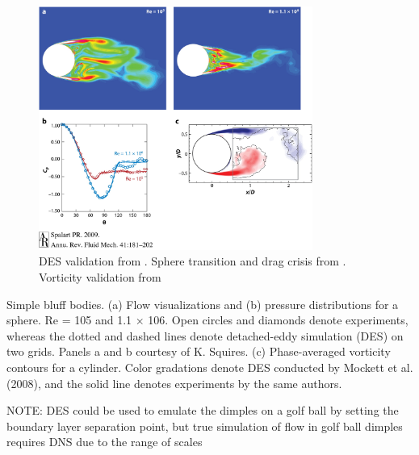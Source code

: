 \documentclass[journal]{new-aiaa}
\begin{document}
\begin{figure}[H]
\begin{center}
\includegraphics[width=0.8\textwidth]{Images/logan/spalart2009detachededdy_SphereSeparation.jpeg}
\caption{ DES validation from \cite{spalart2009detachededdy}. Sphere transition and drag crisis from \cite{squires2004detachededdy}.  Vorticity validation from \cite{mockett2008demonstration} }
\label{fig:desspherevalidation}
\end{center}
\end{figure}

Simple bluff bodies. (a) Flow visualizations and (b) pressure distributions for a sphere. Re = 105 and 1.1 × 106. Open circles and
diamonds denote experiments, whereas the dotted and dashed lines denote detached-eddy simulation (DES) on two grids. Panels a and
b courtesy of K. Squires. (c) Phase-averaged vorticity contours for a cylinder. Color gradations denote DES conducted by Mockett et al.
(2008), and the solid line denotes experiments by the same authors.

NOTE: DES could be used to emulate the dimples on a golf ball by setting the boundary layer separation point, but true simulation of flow in golf ball dimples requires DNS due to the range of scales
\end{document}
